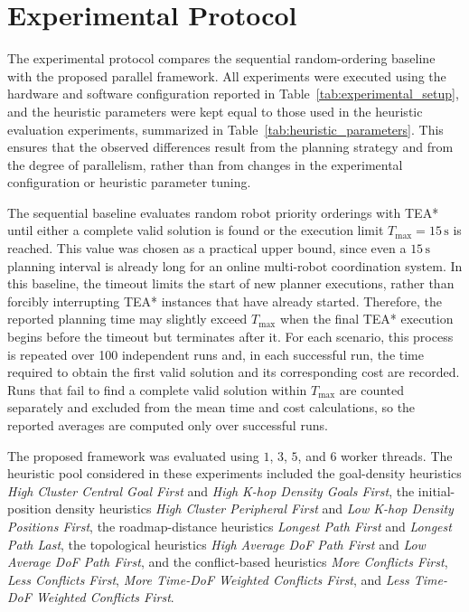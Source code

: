 \section{Experimental Protocol}
\label{sec:parallel_experimental_protocol}
\hspace{\parindent}
The experimental protocol compares the sequential random-ordering baseline with the proposed
parallel framework. All experiments were executed using the hardware and software configuration
reported in Table~\ref{tab:experimental_setup}, and the heuristic parameters were kept equal to
those used in the heuristic evaluation experiments, summarized in
Table~\ref{tab:heuristic_parameters}. This ensures that the observed differences result from the
planning strategy and from the degree of parallelism, rather than from changes in the experimental
configuration or heuristic parameter tuning.

The sequential baseline evaluates random robot priority orderings with TEA* until either a complete
valid solution is found or the execution limit \(T_{\max}=15\,\mathrm{s}\) is reached. This value was
chosen as a practical upper bound, since even a \(15\,\mathrm{s}\) planning interval is already long
for an online multi-robot coordination system. In this baseline, the timeout limits the start of new
planner executions, rather than forcibly interrupting TEA* instances that have already started.
Therefore, the reported planning time may slightly exceed \(T_{\max}\) when the final TEA*
execution begins before the timeout but terminates after it. For each scenario, this process is
repeated over 100 independent runs and, in each successful run, the time required to obtain the first
valid solution and its corresponding cost are recorded. Runs that fail to find a complete valid
solution within \(T_{\max}\) are counted separately and excluded from the mean time and cost
calculations, so the reported averages are computed only over successful runs.

The proposed framework was evaluated using \(1\), \(3\), \(5\), and \(6\) worker threads. The
heuristic pool considered in these experiments included the goal-density heuristics
\textit{High Cluster Central Goal First} and \textit{High K-hop Density Goals First}, the
initial-position density heuristics \textit{High Cluster Peripheral First} and
\textit{Low K-hop Density Positions First}, the roadmap-distance heuristics
\textit{Longest Path First} and \textit{Longest Path Last}, the topological heuristics
\textit{High Average DoF Path First} and \textit{Low Average DoF Path First}, and the
conflict-based heuristics \textit{More Conflicts First}, \textit{Less Conflicts First},
\textit{More Time-DoF Weighted Conflicts First}, and
\textit{Less Time-DoF Weighted Conflicts First}.

